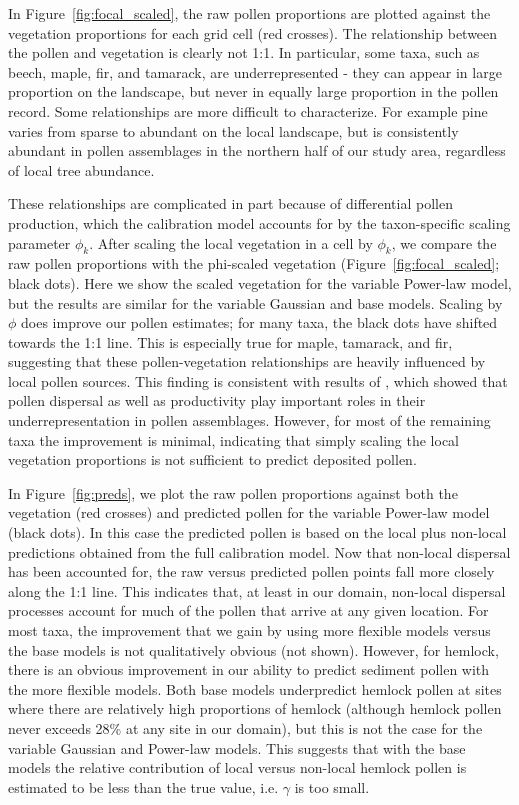 \documentclass[12pt]{article}
\begin{document}
In Figure~\ref{fig:focal_scaled}, the raw pollen proportions are
plotted against the vegetation proportions for each grid cell (red
crosses). The relationship between the pollen and vegetation is
clearly not 1:1. In particular, some taxa, such as beech, maple, fir,
and tamarack, are underrepresented - they can appear in large
proportion on the landscape, but never in equally large proportion in
the pollen record. Some relationships are more difficult to
characterize. For example pine varies from sparse to abundant on the
local landscape, but is consistently abundant in pollen assemblages in
the northern half of our study area, regardless of local tree
abundance.

These relationships are complicated in part because of differential
pollen production, which the calibration model accounts for by the
taxon-specific scaling parameter $\phi_k$. After scaling the local
vegetation in a cell by $\phi_k$, we compare the raw pollen
proportions with the phi-scaled vegetation
(Figure~\ref{fig:focal_scaled}; black dots). Here we show the scaled
vegetation for the variable Power-law model, but the results are
similar for the variable Gaussian and base models. Scaling by $\phi$
does improve our pollen estimates; for many taxa, the black dots have
shifted towards the 1:1 line. This is especially true for maple,
tamarack, and fir, suggesting that these pollen-vegetation
relationships are heavily influenced by local pollen sources. This
finding is consistent with results of \citet{jackson1990,
  jackson1991pollen}, which showed that pollen dispersal as well as
productivity play important roles in their underrepresentation in
pollen assemblages. However, for most of the remaining taxa the
improvement is minimal, indicating that simply scaling the local
vegetation proportions is not sufficient to predict deposited pollen.

In Figure~\ref{fig:preds}, we plot the raw pollen proportions against
both the vegetation (red crosses) and predicted pollen for the
variable Power-law model (black dots). In this case the predicted
pollen is based on the local plus non-local predictions obtained from
the full calibration model. Now that non-local dispersal has been
accounted for, the raw versus predicted pollen points fall more
closely along the 1:1 line. This indicates that, at least in our
domain, non-local dispersal processes account for much of the pollen
that arrive at any given location. For most taxa, the improvement that
we gain by using more flexible models versus the base models is not
qualitatively obvious (not shown). However, for hemlock, there is an
obvious improvement in our ability to predict sediment pollen with the
more flexible models. Both base models underpredict hemlock pollen at
sites where there are relatively high proportions of hemlock (although
hemlock pollen never exceeds 28\% at any site in our domain), but this
is not the case for the variable Gaussian and Power-law models. This
suggests that with the base models the relative contribution of local
versus non-local hemlock pollen is estimated to be less than the true
value, i.e. $\gamma$ is too small.
\end{document}
